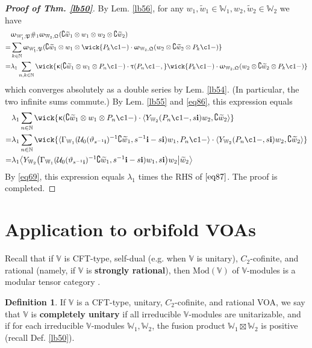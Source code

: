 \documentclass[11pt,b5paper,notitlepage]{article}
\theoremstyle{definition}
\newtheorem{df}{Definition}[section]
\theoremstyle{plain}
\newcommand{\fk}{\mathfrak}
\newcommand{\mc}{\mathcal}
\newcommand{\wtd}{\widetilde}
\newcommand{\bigbk}[1]{\big\langle {#1}\big\rangle}
\newcommand{\im}{\mathbf{i}}
\newcommand{\Co}{\complement}
\newcommand{\Vbb}{\mathbb V}
\newcommand{\Wbb}{\mathbb W}
\newcommand{\Nbb}{\mathbb N}
\newcommand{\Mod}{\mathrm{Mod}}
\numberwithin{equation}{section}
\begin{document}
\begin{proof}[\textbf{Proof of Thm. \ref{lb50}}]
By Lem. \ref{lb56}, for any $w_1,\wtd w_1\in\Wbb_1,w_2,\wtd w_2\in\Wbb_2$ we have
\begin{align*}
&\upomega_{\Wbb_1',\fk P}\#_1\upomega_{\Wbb_2,\fk Q}(\Co\wtd w_1\otimes w_1\otimes w_2\otimes\Co\wtd w_2)\\
=&\sum_{k\in\Nbb} \upomega_{\Wbb_1',\fk P}(\Co\wtd w_1\otimes w_1\otimes \wick{P_k \c1 -)\cdot \upomega_{\Wbb_2,\fk Q}(w_2\otimes \Co\wtd w_2\otimes P_k \c1-)}  \\
=&\lambda_1\sum_{n,k\in\Nbb} \wick{\upkappa(\Co\wtd w_1\otimes w_1\otimes P_n\c1 -)\cdot \uptau(P_n\c1 -,}\wick{P_k \c1 -)\cdot \upomega_{\Wbb_2,\fk Q}(w_2\otimes\Co\wtd w_2\otimes P_k \c1 -) }
\end{align*}
which converges absolutely as a double series by Lem. \ref{lb54}. (In particular, the two infinite sums commute.) By Lem. \ref{lb55} and \eqref{eq86}, this expression equals
\begin{align*}
&\lambda_1\sum_{n\in\Nbb} \wick{\upkappa(\Co\wtd w_1\otimes w_1\otimes P_n\c1 -)\cdot \langle Y_{\Wbb_2}(P_n \c1-,s\im)w_2,\Co\wtd w_2 \rangle}\\
=&\lambda_1\sum_{n\in\Nbb} \wick{\langle \Gamma_{\Wbb_1}(\mc U_0(\vartheta_{s^{-1}\im})^{-1}\Co\wtd w_1,s^{-1}\im-s\im)w_1, P_n \c1- \rangle\cdot \langle Y_{\Wbb_2}(P_n \c1-,s\im)w_2,\Co\wtd w_2 \rangle}\\
=&\lambda_1 \bigbk{Y_{\Wbb_2}\big( \Gamma_{\Wbb_1}(\mc U_0(\vartheta_{s^{-1}\im})^{-1}\Co\wtd w_1,s^{-1}\im-s\im)w_1,s\im\big)w_2\big|\wtd w_2}
\end{align*}
By \eqref{eq69}, this expression equals $\lambda_1$ times the RHS of $\eqref{eq87}$. The proof is completed.
\end{proof}



\section{Application to orbifold VOAs}




Recall that if  $\Vbb$ is CFT-type, self-dual (e.g. when $\Vbb$ is unitary), $C_2$-cofinite, and  rational (namely, if $\Vbb$ is \textbf{strongly rational}), then $\Mod(\Vbb)$ of $\Vbb$-modules is a modular tensor category \cite{Hua08}. 

\begin{df}
If $\Vbb$ is a CFT-type, unitary, $C_2$-cofinite, and rational VOA, we say that $\Vbb$ is \textbf{completely unitary} if all irreducible $\Vbb$-modules are unitarizable, and if for each irreducible $\Vbb$-modules $\Wbb_1,\Wbb_2$, the fusion product $\Wbb_1\boxtimes\Wbb_2$ is positive (recall Def. \ref{lb50}).
\end{df}
\end{document}
